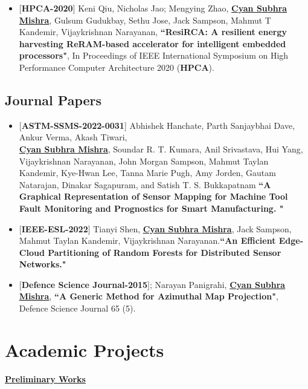 \documentclass[letterpaper,11pt]{article}
\begin{document}
\begin{itemize}
\item \small{[\textbf{HPCA-2020}] Keni Qiu, Nicholas Jao; Mengying Zhao, \textbf{\underline{Cyan Subhra Mishra}}, Gulsum Gudukbay, Sethu Jose, Jack Sampson, Mahmut T Kandemir, Vijaykrishnan Narayanan, \textbf{``ResiRCA: A resilient energy harvesting ReRAM-based accelerator for intelligent embedded processors"}, In Proceedings of IEEE International Symposium on High Performance Computer Architecture 2020 (\textbf{HPCA}).}

\end{itemize}

\subsection*{Journal Papers}
\begin{itemize}
\item \small{[\textbf{ASTM-SSMS-2022-0031}] Abhishek Hanchate, Parth Sanjaybhai Dave, Ankur Verma, Akash Tiwari, \\\textbf{\underline{Cyan Subhra Mishra}}, Soundar R. T. Kumara, Anil Srivastava, Hui Yang,
Vijaykrishnan Narayanan, John Morgan Sampson, Mahmut Taylan Kandemir,
Kye-Hwan Lee, Tanna Marie Pugh, Amy Jorden, Gautam Natarajan,
Dinakar Sagapuram, and Satish T. S. Bukkapatnam \textbf{``A Graphical Representation of Sensor
Mapping for Machine Tool Fault
Monitoring and Prognostics for Smart
Manufacturing. "}}

\item \small{[\textbf{IEEE-ESL-2022}] Tianyi Shen, \textbf{\underline{Cyan Subhra Mishra}}, Jack Sampson, Mahmut Taylan Kandemir, Vijaykrishnan Narayanan.\textbf{``An Efficient Edge-Cloud Partitioning of Random Forests for Distributed Sensor Networks."}}
    
\item \small{[\textbf{Defence Science Journal-2015}]; Narayan Panigrahi, \textbf{\underline{Cyan Subhra Mishra}}, \textbf{``A Generic Method for Azimuthal Map Projection"}, Defence Science Journal 65 (5).}

\end{itemize}


\section{Academic Projects}
\textbf{\underline{Preliminary Works}}

\end{document}
